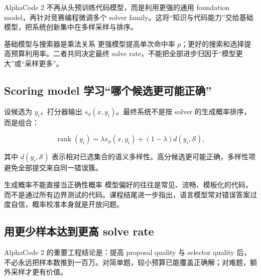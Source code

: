 \documentclass[a4paper]{article}
\begin{document}
AlphaCode 2 不再从头预训练代码模型，而是利用更强的通用 foundation model，再针对竞赛编程微调多个 solver family。这将“知识与代码能力”交给基础模型，把系统创新集中在多样采样与排序。


\begin{importantbox}{基础模型与搜索器是乘法关系}
更强模型提高单次命中率 $p$；更好的搜索和选择提高预算利用率。二者共同决定最终 solve rate，不能把全部进步归因于“模型更大”或“采样更多”。
\end{importantbox}

\subsection{Scoring model 学习“哪个候选更可能正确”}


设候选为 $y_i$，打分器输出 $s_\phi(x,y_i)$。最终系统不是按 solver 的生成概率排序，而是组合：

$$
\operatorname{rank}(y_i)=
\lambda s_\phi(x,y_i)+(1-\lambda)d(y_i,\mathcal S),
$$

其中 $d(y_i,\mathcal S)$ 表示相对已选集合的语义多样性。高分候选更可能正确，多样性项避免全部提交来自同一错误簇。

\begin{warningbox}{生成概率不能直接当正确性概率}
模型偏好的往往是常见、流畅、模板化的代码，而不是通过所有边界测试的代码。课程结尾进一步指出，语言模型常对错误答案过度自信，概率校准本身就是开放问题。
\end{warningbox}


\subsection{用更少样本达到更高 solve rate}


AlphaCode 2 的重要工程结论是：提高 proposal quality 与 selector quality 后，不必永远把样本数推到一百万。对简单题，较小预算已能覆盖正确解；对难题，额外采样才更有价值。
\end{document}
